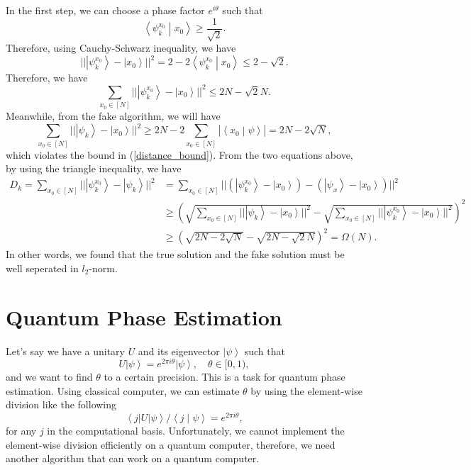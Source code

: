 \documentclass[11pt]{article}
\newcommand{\braket}[2]{\left \langle #1 \middle| #2 \right \rangle}
\newcommand{\bra}[1]{\left\langle #1\right|}
\newcommand{\ket}[1]{\left|#1\right\rangle}
\begin{document}
In the first step, we can choose a phase factor $e^{i\theta}$ such that 
\begin{equation}
    \braket{\psi_k^{x_0}}{x_0} \geq \frac{1}{\sqrt{2}}.
\end{equation}
Therefore, using Cauchy-Schwarz inequality, we have
\begin{equation}
    ||\ket{\psi_k^{x_0}} - \ket{x_0}||^2 = 2 - 2\braket{\psi_k^{x_0}}{x_0} \leq 2 - \sqrt{2}.
\end{equation}
Therefore, we have 
\begin{equation}\label{distance_bound}
    \sum_{x_0\in[N]}||\ket{\psi_k^{x_0}} - \ket{x_0}||^2  \leq 2N - \sqrt{2}N.
\end{equation}
Meanwhile, from the fake algorithm, we  will have 
\begin{equation}
    \sum_{x_0\in[N]}||\ket{\psi_k} - \ket{x_0}||^2 \geq 2N - 2\sum_{x_0\in[N]}|\braket{x_0}{\psi}|  = 2N - 2\sqrt{N},
\end{equation}
which violates the bound in (\ref*{distance_bound}). 
From the two equations above, by using the triangle inequality, we have 
\begin{align}
    D_k = \sum_{x_0\in[N]}||\ket{\psi_k^{x_0}} - \ket{\psi_k}||^2 &= \sum_{x_0\in[N]}||(\ket{\psi_k^{x_0}} - \ket{x_0}) - (\ket{\psi_x} - \ket{x_0})||^2 \\
    &\geq \left(\sqrt{\sum_{x_0\in[N]}||\ket{\psi_k} - \ket{x_0}||^2} - \sqrt{\sum_{x_0\in[N]}||\ket{\psi_k^{x_0}} - \ket{x_0}||^2}\right)^2 \\
    &\geq (\sqrt{2N - 2\sqrt{N}} - \sqrt{2N - \sqrt{2}N})^2 = \Omega(N).
\end{align}
In other words, we found that the true solution and the fake solution must be well seperated in $l_2$-norm.

\section{Quantum Phase Estimation}
Let's say we have a unitary $U$ and its eigenvector $\ket{\psi}$ such that 
\begin{equation}
    U\ket{\psi} = e^{2\pi i\theta}\ket{\psi},\quad \theta \in [0,1),
\end{equation}
and we want to find $\theta$ to a certain precision. This is a task for quantum phase estimation. Using classical computer, we can estimate $\theta$ by using the element-wise division like the following 
\begin{equation}
    \bra{j}U\ket{\psi}/\braket{j}{\psi} = e^{2\pi i\theta },
\end{equation}
for any $j$ in the computational basis. Unfortunately, we cannot implement the element-wise division efficiently on a quantum computer, therefore, we need another algorithm that can work on a quantum computer. 
\end{document}
